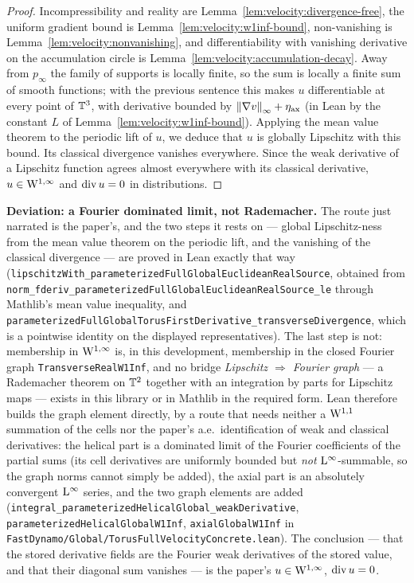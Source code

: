 \begin{proof}
  \leanok
  Incompressibility and reality are Lemma~\ref{lem:velocity:divergence-free}, the uniform
  gradient bound is Lemma~\ref{lem:velocity:w1inf-bound}, non-vanishing is
  Lemma~\ref{lem:velocity:nonvanishing}, and differentiability with vanishing derivative on
  the accumulation circle is Lemma~\ref{lem:velocity:accumulation-decay}.  Away from
  $p_\infty $ the family of supports is locally finite, so the sum is locally a finite sum
  of smooth functions; with the previous sentence this makes $u $ differentiable at every
  point of $\mathbb{T}^3 $, with derivative bounded by $\left\|\nabla v\right\|_\infty+\eta_\mathrm{ax} $
  (in Lean by the constant $L $ of Lemma~\ref{lem:velocity:w1inf-bound}).  Applying the mean value theorem to the periodic
  lift of $u $, we deduce that $u $ is globally Lipschitz with this bound.  Its classical
  divergence vanishes everywhere.  Since the weak derivative of a Lipschitz function agrees
  almost everywhere with its classical derivative, $u\in\mathrm{W}^{1,\infty} $ and $\operatorname{div} u=0 $ in
  distributions.
\end{proof}

\textbf{Deviation: a Fourier dominated limit, not Rademacher.}  The route just narrated is
the paper's, and the two steps it rests on --- global
Lipschitz-ness from the mean value theorem on the periodic lift, and the vanishing of the
classical divergence --- are proved in Lean exactly that way
(\texttt{lipschitzWith\_parameterizedFullGlobalEuclideanRealSource}, obtained from
\texttt{norm\_\allowbreak fderiv\_\allowbreak parameterizedFullGlobalEuclideanRealSource\_\allowbreak le} through Mathlib's mean value inequality, and
\texttt{parameterizedFullGlobalTorusFirstDerivative\_transverseDivergence}, which is a
pointwise identity on the displayed representatives).  The last step is not: membership in
$\mathrm{W}^{1,\infty} $ is, in this development, membership in the closed Fourier graph
\texttt{TransverseRealW1Inf}, and no bridge \emph{Lipschitz $\Rightarrow$ Fourier graph}
--- a Rademacher theorem on $\mathbb{T}^2 $ together with an integration by parts for Lipschitz maps
--- exists in this library or in Mathlib in the required form.  Lean therefore builds the
graph element directly, by a route that needs neither a $\mathrm{W}^{1,1} $ summation of the cells
nor the paper's a.e.\ identification of weak and classical derivatives: the helical part is a dominated
limit of the Fourier coefficients of the partial sums (its cell derivatives are uniformly
bounded but \emph{not} $\mathrm{L}^\infty $-summable, so the graph norms cannot simply be added),
the axial part is an absolutely convergent $\mathrm{L}^\infty $ series, and the two graph elements
are added
(\texttt{integral\_parameterizedHelicalGlobal\_weakDerivative},
\texttt{parameterizedHelicalGlobalW1Inf}, \texttt{axialGlobalW1Inf} in
\texttt{FastDynamo/Global/TorusFullVelocityConcrete.lean}).  The conclusion --- that the
stored derivative fields are the Fourier weak derivatives of the stored value, and that
their diagonal sum vanishes --- is the paper's $u\in\mathrm{W}^{1,\infty} $, $\operatorname{div} u=0 $.

